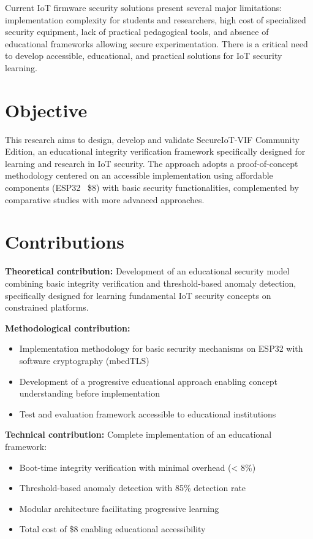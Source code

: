 Current IoT firmware security solutions present several major limitations: implementation complexity for students and researchers, high cost of specialized security equipment, lack of practical pedagogical tools, and absence of educational frameworks allowing secure experimentation. There is a critical need to develop accessible, educational, and practical solutions for IoT security learning.

\section*{Objective}

This research aims to design, develop and validate SecureIoT-VIF Community Edition, an educational integrity verification framework specifically designed for learning and research in IoT security. The approach adopts a proof-of-concept methodology centered on an accessible implementation using affordable components (ESP32 ~\$8) with basic security functionalities, complemented by comparative studies with more advanced approaches.

\section*{Contributions}

\textbf{Theoretical contribution:} Development of an educational security model combining basic integrity verification and threshold-based anomaly detection, specifically designed for learning fundamental IoT security concepts on constrained platforms.

\textbf{Methodological contribution:}
\begin{itemize}
    \item Implementation methodology for basic security mechanisms on ESP32 with software cryptography (mbedTLS)
    \item Development of a progressive educational approach enabling concept understanding before implementation
    \item Test and evaluation framework accessible to educational institutions
\end{itemize}

\textbf{Technical contribution:} Complete implementation of an educational framework:
\begin{itemize}
    \item Boot-time integrity verification with minimal overhead (< 8\%)
    \item Threshold-based anomaly detection with 85\% detection rate
    \item Modular architecture facilitating progressive learning
    \item Total cost of \$8 enabling educational accessibility
\end{itemize}


